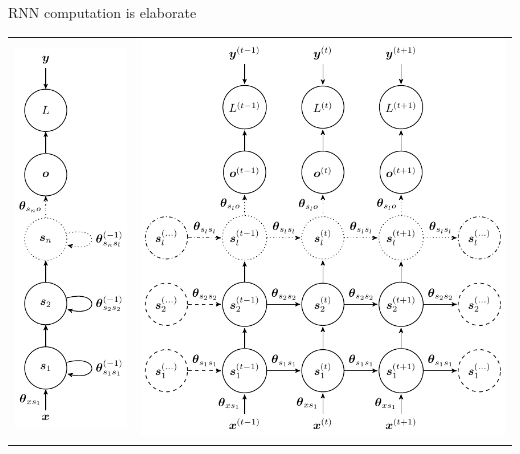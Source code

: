 \documentclass{beamer}
\begin{document}
\begin{frame}{RNN computation is elaborate}
    \begin{tabular}{p{\wd\rnn}|p{\wd\rnnuf}}
      \includegraphics[width=.7\wd\rnn]{figs/rnn.pdf}  & 
                                                         \includegraphics[width=.7\wd\rnnuf]{figs/rnn_uf.pdf}  
    \end{tabular}

  \end{frame}
\end{document}
